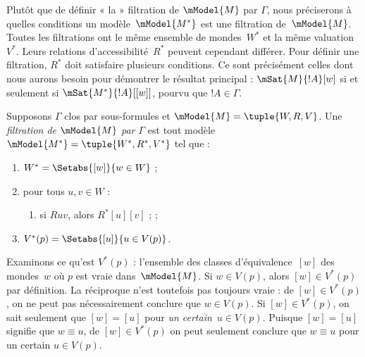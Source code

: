 \documentclass[../../../include/open-logic-section]{subfiles}
\begin{document}


Plutôt que de définir « la » filtration de $\mModel{M}$ par
$\Gamma$, nous préciserons à quelles conditions un modèle~$\mModel{M^*}$
est une filtration de~$\mModel{M}$. Toutes les filtrations ont le même
ensemble de mondes~$W^*$ et la même valuation~$V^*$. Leurs relations
d'accessibilité~$R^*$ peuvent cependant différer. Pour définir une
filtration, $R^*$ doit satisfaire plusieurs conditions. Ce sont
précisément celles dont nous aurons besoin pour démontrer le résultat
principal : $\mSat{M}{!A}[w]$ si et seulement si
$\mSat{M^*}{!A}[{[w]}]$, pourvu que $!A \in \Gamma$.

\begin{defn}
  Supposons $\Gamma$ clos par sous-formules et $\mModel{M} = \tuple{W,
    R, V}$. Une \emph{filtration de $\mModel{M}$ par $\Gamma$} est
  tout modèle $\mModel{M^*} = \tuple{W^*,R^*,V^*}$ tel que :
  \begin{enumerate}
  \item $W^* = \Setabs{[w]}{w \in W}$ ;
  \item {}%
    pour tous $u,v \in W$ :
    \begin{enumerate}
    \item {}%
      si $Ruv$, alors $R^*[u][v]$ ;
     ;
    \end{enumerate}
  \item $V^*(p) = \Setabs{[u]}{u \in V(p)}$.
  \end{enumerate}
\end{defn}

Examinons ce qu'est $V^*(p)$ : l'ensemble des classes
d'équivalence~$[w]$ des mondes~$w$ où $p$ est vraie dans~$\mModel{M}$.
Si $w \in V(p)$, alors $[w] \in V^*(p)$ par définition. La réciproque
n'est toutefois pas toujours vraie : de $[w] \in V^*(p)$, on ne peut
pas nécessairement conclure que $w \in V(p)$. Si $[w] \in V^*(p)$,
on sait seulement que
$[w] = [u]$ pour \emph{un certain}~$u \in V(p)$. Puisque $[w] = [u]$
signifie que $w \equiv u$, de $[w] \in V^*(p)$ on peut seulement
conclure que $w \equiv u$ pour un certain $u \in V(p)$.
\end{document}
